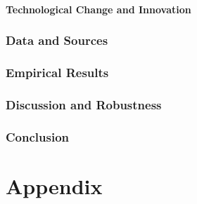 \documentclass[11pt,letterpaper]{article}
\begin{document}
\subsection{Technological Change and Innovation}


\section{Data and Sources}\label{sec:data}

	

\section{Empirical Results}\label{sec:results}



\section{Discussion and Robustness}
  
\section{Conclusion}\label{sec:conclusion}

\clearpage	
{\small
	
	
}	
\clearpage

\appendix 
	\part*{Appendix}\label{app:dix}
	\renewcommand*{\thepage}{A\arabic{page}}
	\renewcommand{\thetable}{A\arabic{table}}
	
\end{document}
